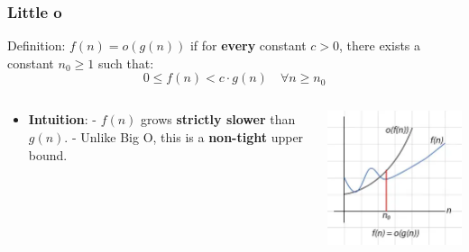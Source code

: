 \begin{frame}
  \frametitle{Little o}
 
  \begin{block}{Definition:}
        $f(n) = o(g(n))$ if for \textbf{every} constant $c > 0$, there exists a constant $n_0 \geq 1$ such that:
        \[
        0 \leq f(n) < c \cdot g(n) \quad \forall n \geq n_0
        \]
        \end{block}
         \begin{columns}
    \begin{column}{0.7\textwidth}
      \begin{itemize}
        \item \textbf{Intuition}:  
        - $f(n)$ grows \textbf{strictly slower} than $g(n)$.  
        - Unlike Big O, this is a \textbf{non-tight} upper bound.  
        \vspace{5pt}
     \end{itemize}
    \end{column}

    \begin{column}{0.3\textwidth}
      \includegraphics[width=\textwidth]{figures/MasterTheorem/little_o.jpg}
    \end{column}
  \end{columns}
\end{frame}

